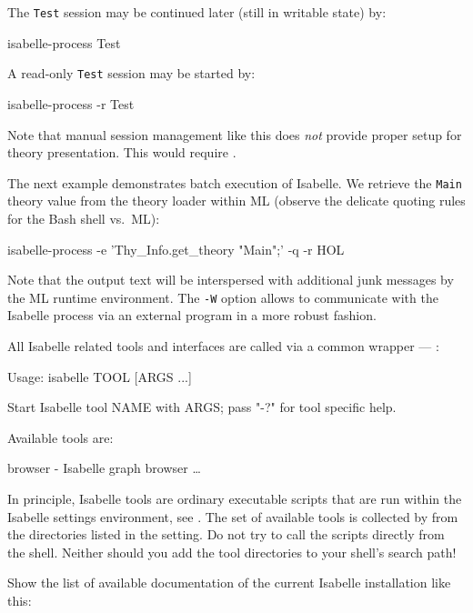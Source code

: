 \begin{isabellebody}
\begin{isamarkuptext}
  The \verb|Test| session may be continued later (still in
  writable state) by:
\begin{ttbox}
isabelle-process Test
\end{ttbox}
  A read-only \verb|Test| session may be started by:
\begin{ttbox}
isabelle-process -r Test
\end{ttbox}

  \medskip Note that manual session management like this does
  \emph{not} provide proper setup for theory presentation.  This would
  require \hyperlink{tool.usedir}{\mbox{}}.

  \bigskip The next example demonstrates batch execution of Isabelle.
  We retrieve the \verb|Main| theory value from the theory loader
  within ML (observe the delicate quoting rules for the Bash shell
  vs.\ ML):
\begin{ttbox}
isabelle-process -e 'Thy_Info.get_theory "Main";' -q -r HOL
\end{ttbox}
  Note that the output text will be interspersed with additional junk
  messages by the ML runtime environment.  The \verb|-W| option
  allows to communicate with the Isabelle process via an external
  program in a more robust fashion.%
\end{isamarkuptext}%
\isamarkuptrue%
%
\isamarkuptrue%
%
\begin{isamarkuptext}%
All Isabelle related tools and interfaces are called via a common
  wrapper --- \hyperlink{executable.isabelle}{\mbox{}}:

\begin{ttbox}
Usage: isabelle TOOL [ARGS ...]

  Start Isabelle tool NAME with ARGS; pass "-?" for tool specific help.

  Available tools are:

    browser - Isabelle graph browser
    \dots
\end{ttbox}

  In principle, Isabelle tools are ordinary executable scripts that
  are run within the Isabelle settings environment, see
  .  The set of available tools is collected by
  \hyperlink{executable.isabelle}{\mbox{}} from the directories listed in the \hyperlink{setting.ISABELLE-TOOLS}{\mbox{}} setting.  Do not try to call the scripts directly
  from the shell.  Neither should you add the tool directories to your
  shell's search path!%
\end{isamarkuptext}%
\isamarkuptrue%
%
\isamarkuptrue%
%
\begin{isamarkuptext}%
Show the list of available documentation of the current Isabelle
  installation like this:


\end{isamarkuptext}
\end{isabellebody}
